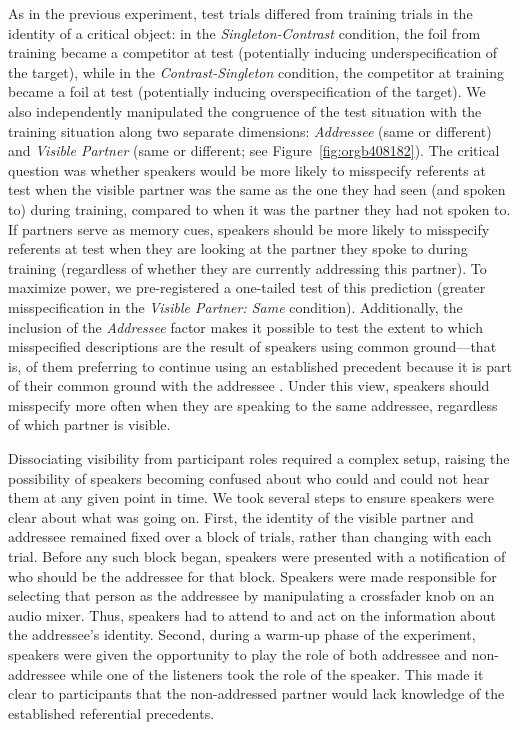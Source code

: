 \documentclass[natbib,man,a4paper]{apa6}
\begin{document}
As in the previous experiment, test trials differed from training trials in the identity of a critical object: in the \emph{Singleton-Contrast} condition, the foil from training became a competitor at test (potentially inducing underspecification of the target), while in the \emph{Contrast-Singleton} condition, the competitor at training became a foil at test (potentially inducing overspecification of the target). We also independently manipulated the congruence of the test situation with the training situation along two separate dimensions: \emph{Addressee} (same or different) and \emph{Visible Partner} (same or different; see Figure~\ref{fig:orgb408182}). The critical question was whether speakers would be more likely to misspecify referents at test when the visible partner was the same as the one they had seen (and spoken to) during training, compared to when it was the partner they had not spoken to.  If partners serve as memory cues, speakers should be more likely to misspecify referents at test when they are looking at the partner they spoke to during training (regardless of whether they are currently addressing this partner). To maximize power, we pre-registered a one-tailed test of this prediction (greater misspecification in the \emph{Visible Partner: Same} condition).  Additionally, the inclusion of the \emph{Addressee} factor makes it possible to test the extent to which misspecified descriptions are the result of speakers using common ground---that is, of them preferring to continue using an established precedent because it is part of their common ground with the addressee \citep{brennanclark96}. Under this view, speakers should misspecify more often when they are speaking to the same addressee, regardless of which partner is visible.

Dissociating visibility from participant roles required a complex setup, raising the possibility of speakers becoming confused about who could and could not hear them at any given point in time. We took several steps to ensure speakers were clear about what was going on. First, the identity of the visible partner and addressee remained fixed over a block of trials, rather than changing with each trial. Before any such block began, speakers were presented with a notification of who should be the addressee for that block. Speakers were made responsible for selecting that person as the addressee by manipulating a crossfader knob on an audio mixer. Thus, speakers had to attend to and act on the information about the addressee's identity. Second, during a warm-up phase of the experiment, speakers were given the opportunity to play the role of both addressee and non-addressee while one of the listeners took the role of the speaker. This made it clear to participants that the non-addressed partner would lack knowledge of the established referential precedents. 
\end{document}
